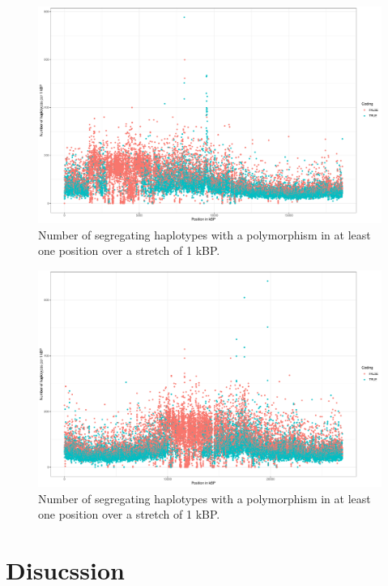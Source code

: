 \begin{figure}[th]
\centering
\includegraphics[height=.55\textheight, width=1.1\textwidth]{Figures/chr4_hap}
\decoRule
\caption[Haplotype strutcture of chromosome 4 of \textit{A. thaliana}]{Number of segregating haplotypes with a polymorphism in at least one position over a stretch of 1 kBP. }
\label{fig:time_marker}
\end{figure}


\begin{figure}[th]
\centering
\includegraphics[height=.55\textheight, width=1.1\textwidth]{Figures/chr5_hap}
\decoRule
\caption[Haplotype strutcture of chromosome 5 of \textit{A. thaliana}]{Number of segregating haplotypes with a polymorphism in at least one position over a stretch of 1 kBP. }
\label{fig:time_marker}
\end{figure}





\section{Disucssion}


